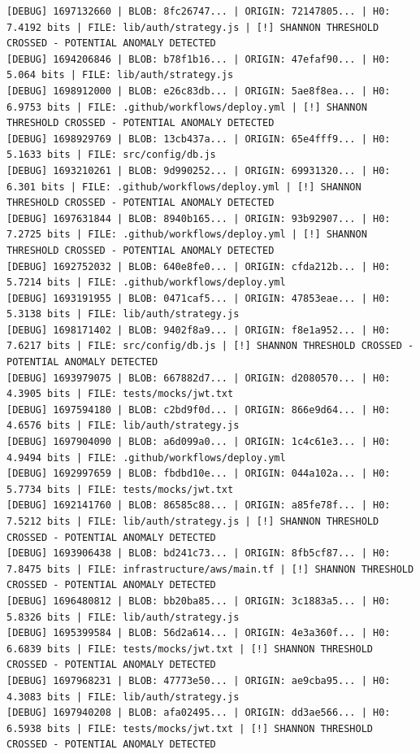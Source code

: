 \documentclass[12pt, a4paper, oneside]{report}
\begin{document}
\begin{lstlisting}[basicstyle=\tiny\ttfamily]
[DEBUG] 1697132660 | BLOB: 8fc26747... | ORIGIN: 72147805... | H0: 7.4192 bits | FILE: lib/auth/strategy.js | [!] SHANNON THRESHOLD CROSSED - POTENTIAL ANOMALY DETECTED
[DEBUG] 1694206846 | BLOB: b78f1b16... | ORIGIN: 47efaf90... | H0: 5.064 bits | FILE: lib/auth/strategy.js
[DEBUG] 1698912000 | BLOB: e26c83db... | ORIGIN: 5ae8f8ea... | H0: 6.9753 bits | FILE: .github/workflows/deploy.yml | [!] SHANNON THRESHOLD CROSSED - POTENTIAL ANOMALY DETECTED
[DEBUG] 1698929769 | BLOB: 13cb437a... | ORIGIN: 65e4fff9... | H0: 5.1633 bits | FILE: src/config/db.js
[DEBUG] 1693210261 | BLOB: 9d990252... | ORIGIN: 69931320... | H0: 6.301 bits | FILE: .github/workflows/deploy.yml | [!] SHANNON THRESHOLD CROSSED - POTENTIAL ANOMALY DETECTED
[DEBUG] 1697631844 | BLOB: 8940b165... | ORIGIN: 93b92907... | H0: 7.2725 bits | FILE: .github/workflows/deploy.yml | [!] SHANNON THRESHOLD CROSSED - POTENTIAL ANOMALY DETECTED
[DEBUG] 1692752032 | BLOB: 640e8fe0... | ORIGIN: cfda212b... | H0: 5.7214 bits | FILE: .github/workflows/deploy.yml
[DEBUG] 1693191955 | BLOB: 0471caf5... | ORIGIN: 47853eae... | H0: 5.3138 bits | FILE: lib/auth/strategy.js
[DEBUG] 1698171402 | BLOB: 9402f8a9... | ORIGIN: f8e1a952... | H0: 7.6217 bits | FILE: src/config/db.js | [!] SHANNON THRESHOLD CROSSED - POTENTIAL ANOMALY DETECTED
[DEBUG] 1693979075 | BLOB: 667882d7... | ORIGIN: d2080570... | H0: 4.3905 bits | FILE: tests/mocks/jwt.txt
[DEBUG] 1697594180 | BLOB: c2bd9f0d... | ORIGIN: 866e9d64... | H0: 4.6576 bits | FILE: lib/auth/strategy.js
[DEBUG] 1697904090 | BLOB: a6d099a0... | ORIGIN: 1c4c61e3... | H0: 4.9494 bits | FILE: .github/workflows/deploy.yml
[DEBUG] 1692997659 | BLOB: fbdbd10e... | ORIGIN: 044a102a... | H0: 5.7734 bits | FILE: tests/mocks/jwt.txt
[DEBUG] 1692141760 | BLOB: 86585c88... | ORIGIN: a85fe78f... | H0: 7.5212 bits | FILE: lib/auth/strategy.js | [!] SHANNON THRESHOLD CROSSED - POTENTIAL ANOMALY DETECTED
[DEBUG] 1693906438 | BLOB: bd241c73... | ORIGIN: 8fb5cf87... | H0: 7.8475 bits | FILE: infrastructure/aws/main.tf | [!] SHANNON THRESHOLD CROSSED - POTENTIAL ANOMALY DETECTED
[DEBUG] 1696480812 | BLOB: bb20ba85... | ORIGIN: 3c1883a5... | H0: 5.8326 bits | FILE: lib/auth/strategy.js
[DEBUG] 1695399584 | BLOB: 56d2a614... | ORIGIN: 4e3a360f... | H0: 6.6839 bits | FILE: tests/mocks/jwt.txt | [!] SHANNON THRESHOLD CROSSED - POTENTIAL ANOMALY DETECTED
[DEBUG] 1697968231 | BLOB: 47773e50... | ORIGIN: ae9cba95... | H0: 4.3083 bits | FILE: lib/auth/strategy.js
[DEBUG] 1697940208 | BLOB: afa02495... | ORIGIN: dd3ae566... | H0: 6.5938 bits | FILE: tests/mocks/jwt.txt | [!] SHANNON THRESHOLD CROSSED - POTENTIAL ANOMALY DETECTED

\end{lstlisting}
\end{document}
